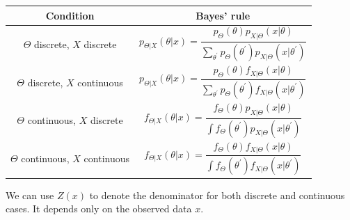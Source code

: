\begin{table}[H]
  \centering
  \begin{tabular}{c|c}
      \toprule
      Condition & Bayes' rule  \\
    \midrule
      \(\Theta\) discrete, \(X\) discrete & \(p_{\Theta \vert X} (\theta \vert x) = \dfrac{p_{\Theta} (\theta) p_{X \vert \Theta} (x \vert \theta)}{\sum_{\theta^{\prime}} p_{\Theta} (\theta^{\prime}) p_{X \vert \Theta} (x \vert \theta^{\prime})}\)  \\
      \(\Theta\) discrete, \(X\) continuous & \(p_{\Theta \vert X} (\theta \vert x) = \dfrac{p_{\Theta} (\theta) f_{X \vert \Theta} (x \vert \theta)}{\sum_{\theta^{\prime}} p_{\Theta} (\theta^{\prime}) f_{X \vert \Theta} (x \vert \theta^{\prime})}\)  \\
      \(\Theta\) continuous, \(X\) discrete & \(f_{\Theta \vert X} (\theta \vert x) = \dfrac{f_{\Theta} (\theta) p_{X \vert \Theta} (x \vert \theta)}{\int f_{\Theta} (\theta^{\prime}) p_{X \vert \Theta} (x \vert \theta^{\prime})}\)  \\
      \(\Theta\) continuous, \(X\) continuous & \(f_{\Theta \vert X} (\theta \vert x) = \dfrac{f_{\Theta} (\theta) f_{X \vert \Theta} (x \vert \theta)}{\int f_{\Theta} (\theta^{\prime}) f_{X \vert \Theta} (x \vert \theta^{\prime})}\)  \\
      \bottomrule
  \end{tabular}
\end{table}

We can use \(Z(x)\) to denote the denominator for both discrete and continuous cases. It depends only on the observed data \(x\).

